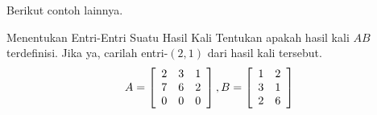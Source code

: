 Berikut contoh lainnya.

\begin{example}{Menentukan Entri-Entri Suatu Hasil Kali}\label{exa:entriesofproduct2}
Tentukan apakah hasil kali $AB$ terdefinisi. Jika ya, carilah entri-$\left( 2, 1 \right)$ dari hasil kali tersebut.
\begin{equation*}
A=
\left[
\begin{array}{rrr}
2 & 3 & 1 \\
7 & 6 & 2 \\
0 & 0 & 0
\end{array}
\right],  B =\left[
\begin{array}{rr}
1 & 2 \\
3 & 1 \\
2 & 6
\end{array}
\right] 
\end{equation*}
\end{example}

